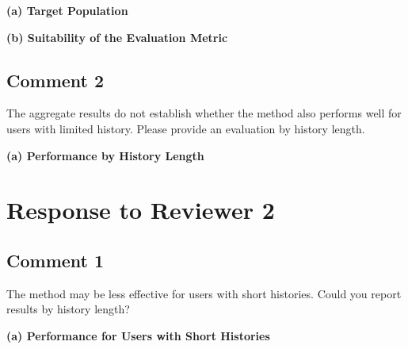 
\textbf{(a) Target Population}\par
\responseplaceholder

\textbf{(b) Suitability of the Evaluation Metric}\par
\responseplaceholder

\subsection*{Comment 2}
\begin{cmt}{}{}
The aggregate results do not establish whether the method also performs well for users with limited history. Please provide an evaluation by history length.
\end{cmt}


\textbf{(a) Performance by History Length}\par
\responseplaceholder

\clearpage
\section*{Response to Reviewer 2}

\subsection*{Comment 1}
\begin{cmt}{}{}
The method may be less effective for users with short histories. Could you report results by history length?
\end{cmt}


\textbf{(a) Performance for Users with Short Histories}\par
\responseplaceholder
